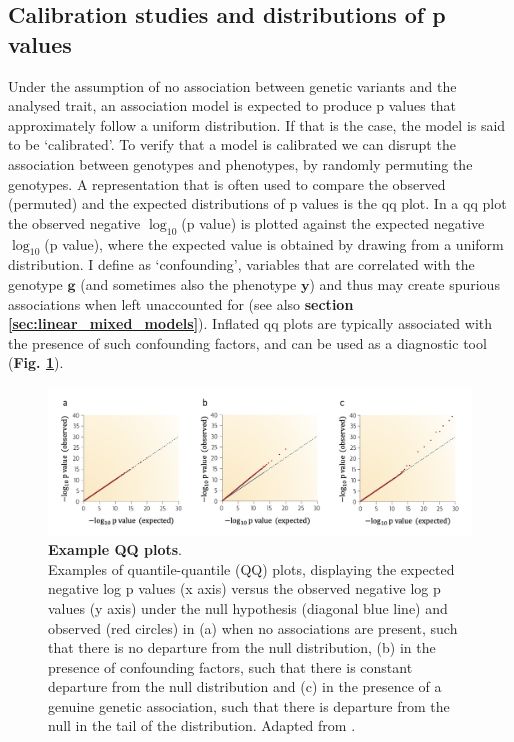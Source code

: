 \subsection{Calibration studies and distributions of p values}

Under the assumption of no association between genetic variants and the analysed trait, an association model is expected to produce p values that approximately follow a uniform distribution.
If that is the case, the model is said to be `calibrated'.
To verify that a model is calibrated we can disrupt the association between genotypes and phenotypes, by randomly permuting the genotypes. 
A representation that is often used to compare the observed (permuted) and the expected distributions of p values is the \gls{qq} plot. 
In a \gls{qq} plot the observed negative $\log_{10}$(p value) is plotted against the expected negative $\log_{10}$(p value), where the expected value is obtained by drawing from a uniform distribution. 
I define as `confounding', variables that are correlated with the genotype $\mathbf{g}$ (and sometimes also the phenotype $\mathbf{y}$) and thus may create spurious associations when left unaccounted for (see also \textbf{section \ref{sec:linear_mixed_models}}).
Inflated \gls{qq} plots are typically associated with the presence of such confounding factors, and can be used as a diagnostic tool (\textbf{Fig. \ref{fig:qqplots}}). 

\begin{figure}[h]
\centering
\includegraphics[width=15cm]{Chapter2/Fig/qqplots.png}
\caption[QQ plots]{\textbf{Example QQ plots}.\\
Examples of quantile-quantile (QQ) plots, displaying the expected negative log p values (x axis) versus the observed negative log p values (y axis) under the null hypothesis (diagonal blue line) and observed (red circles) in (a) when no associations are present, such that there is no departure from the null distribution,  (b) in the presence of confounding factors, such that there is constant departure from the null distribution and (c) in the presence of a genuine genetic association, such that there is departure from the null in the tail of the distribution.
Adapted from \cite{mccarthy2008genome}.}
\label{fig:qqplots}
\end{figure}


